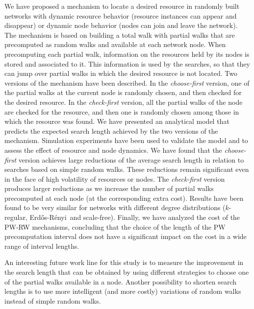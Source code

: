 \documentclass[]{elsarticle}
\newcommand{\ER}	{Erd\H{o}s-R\'{e}nyi}
\begin{document}
We have proposed a mechanism to locate a desired resource in randomly built networks with dynamic resource behavior (resource instances can appear and disappear) or dynamic node behavior (nodes can join and leave the network). The mechanism is based on building a total walk with partial walks that are precomputed as random walks and available at each network node. When precomputing each partial walk, information on the resources held by its nodes is stored and associated to it. This information is used by the searches, so that they can jump over partial walks in which the desired resource is not located. Two versions of the mechanism have been described. In the \emph{choose-first} version, one of the partial walks at the current node is randomly chosen, and then checked for the desired resource. In the \emph{check-first} version, all the partial walks of the node are checked for the resource, and then one is randomly chosen among those in which the resource was found. 
We have presented an analytical model that predicts the expected search length achieved by the two versions of the mechanism. Simulation experiments have been used to validate the model and to assess the effect of resource and node dynamics. We have found that the \emph{choose-first} version achieves large reductions of the average search length in relation to searches based on simple random walks. These reductions remain significant even in the face of high volatility of resources or nodes. The \emph{check-first} version produces larger reductions as we increase the number of partial walks precomputed at each node (at the corresponding extra cost). Results have been found to be very similar for networks with different degree distributions ($k$-regular, \ER\ and scale-free).
Finally, we have analyzed the cost of the PW-RW mechanisms, concluding that the choice of the length of the PW precomputation interval does not have a significant impact on the cost in a wide range of interval lengths. 

An interesting future work line for this study is to measure the improvement in the search length that can be obtained by using different strategies to choose one of the partial walks available in a node. Another possibility to shorten search lengths is to use more intelligent (and more costly) variations of random walks instead of simple random walks.

\newpage





\newpage
\end{document}
